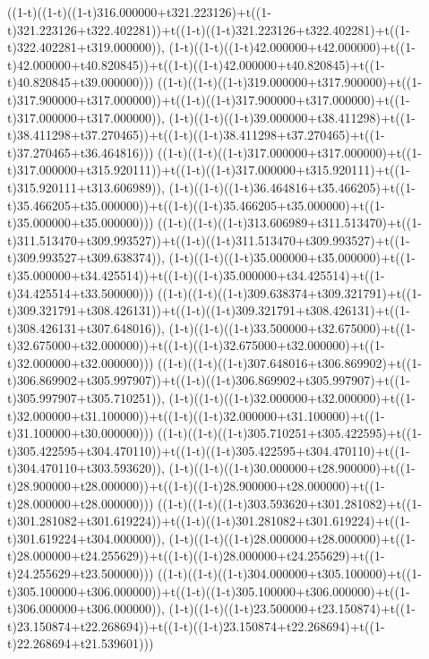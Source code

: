 ((1-t)((1-t)((1-t)316.000000+t321.223126)+t((1-t)321.223126+t322.402281))+t((1-t)((1-t)321.223126+t322.402281)+t((1-t)322.402281+t319.000000)),                                     (1-t)((1-t)((1-t)42.000000+t42.000000)+t((1-t)42.000000+t40.820845))+t((1-t)((1-t)42.000000+t40.820845)+t((1-t)40.820845+t39.000000)))
((1-t)((1-t)((1-t)319.000000+t317.900000)+t((1-t)317.900000+t317.000000))+t((1-t)((1-t)317.900000+t317.000000)+t((1-t)317.000000+t317.000000)),                                     (1-t)((1-t)((1-t)39.000000+t38.411298)+t((1-t)38.411298+t37.270465))+t((1-t)((1-t)38.411298+t37.270465)+t((1-t)37.270465+t36.464816)))
((1-t)((1-t)((1-t)317.000000+t317.000000)+t((1-t)317.000000+t315.920111))+t((1-t)((1-t)317.000000+t315.920111)+t((1-t)315.920111+t313.606989)),                                     (1-t)((1-t)((1-t)36.464816+t35.466205)+t((1-t)35.466205+t35.000000))+t((1-t)((1-t)35.466205+t35.000000)+t((1-t)35.000000+t35.000000)))
((1-t)((1-t)((1-t)313.606989+t311.513470)+t((1-t)311.513470+t309.993527))+t((1-t)((1-t)311.513470+t309.993527)+t((1-t)309.993527+t309.638374)),                                     (1-t)((1-t)((1-t)35.000000+t35.000000)+t((1-t)35.000000+t34.425514))+t((1-t)((1-t)35.000000+t34.425514)+t((1-t)34.425514+t33.500000)))
((1-t)((1-t)((1-t)309.638374+t309.321791)+t((1-t)309.321791+t308.426131))+t((1-t)((1-t)309.321791+t308.426131)+t((1-t)308.426131+t307.648016)),                                     (1-t)((1-t)((1-t)33.500000+t32.675000)+t((1-t)32.675000+t32.000000))+t((1-t)((1-t)32.675000+t32.000000)+t((1-t)32.000000+t32.000000)))
((1-t)((1-t)((1-t)307.648016+t306.869902)+t((1-t)306.869902+t305.997907))+t((1-t)((1-t)306.869902+t305.997907)+t((1-t)305.997907+t305.710251)),                                     (1-t)((1-t)((1-t)32.000000+t32.000000)+t((1-t)32.000000+t31.100000))+t((1-t)((1-t)32.000000+t31.100000)+t((1-t)31.100000+t30.000000)))
((1-t)((1-t)((1-t)305.710251+t305.422595)+t((1-t)305.422595+t304.470110))+t((1-t)((1-t)305.422595+t304.470110)+t((1-t)304.470110+t303.593620)),                                     (1-t)((1-t)((1-t)30.000000+t28.900000)+t((1-t)28.900000+t28.000000))+t((1-t)((1-t)28.900000+t28.000000)+t((1-t)28.000000+t28.000000)))
((1-t)((1-t)((1-t)303.593620+t301.281082)+t((1-t)301.281082+t301.619224))+t((1-t)((1-t)301.281082+t301.619224)+t((1-t)301.619224+t304.000000)),                                     (1-t)((1-t)((1-t)28.000000+t28.000000)+t((1-t)28.000000+t24.255629))+t((1-t)((1-t)28.000000+t24.255629)+t((1-t)24.255629+t23.500000)))
((1-t)((1-t)((1-t)304.000000+t305.100000)+t((1-t)305.100000+t306.000000))+t((1-t)((1-t)305.100000+t306.000000)+t((1-t)306.000000+t306.000000)),                                     (1-t)((1-t)((1-t)23.500000+t23.150874)+t((1-t)23.150874+t22.268694))+t((1-t)((1-t)23.150874+t22.268694)+t((1-t)22.268694+t21.539601)))
